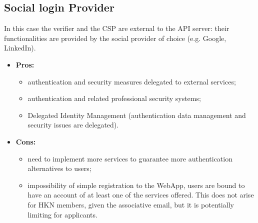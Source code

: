 \subsection{Social login Provider}
In this case the verifier and the CSP are external to the API server: their functionalities are provided by the social provider of choice (e.g. Google, LinkedIn).

\begin{itemize}
	\item \textbf{Pros:}
	\begin{itemize}
		\item authentication and security measures delegated to external services;
		\item authentication and related professional security systems;
		\item Delegated Identity Management (authentication data management and security issues are delegated).
	\end{itemize}
	\item \textbf{Cons:}
	\begin{itemize}
		\item need to implement more services to guarantee more authentication alternatives to users;
		\item impossibility of simple registration to the WebApp, users are bound to have an account of at least one of the services offered. This does not arise for HKN members, given the associative email, but it is potentially limiting for applicants.
	\end{itemize}
\end{itemize}

